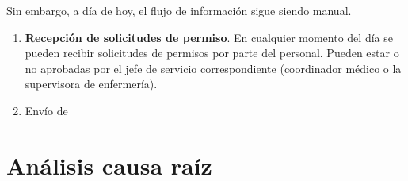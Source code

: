 Sin embargo, a día de hoy, el flujo de información sigue siendo manual.

\begin{enumerate}
    \item \textbf{Recepción de solicitudes de permiso}. En cualquier momento del día se pueden recibir solicitudes de permisos por parte del personal. Pueden estar o no aprobadas por el jefe de servicio correspondiente (coordinador médico o la supervisora de enfermería). 
    \item Envío de 
\end{enumerate}

\section{Análisis causa raíz}